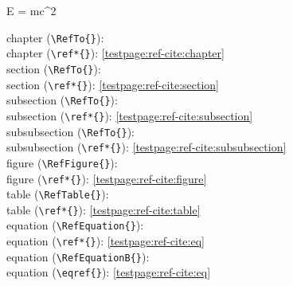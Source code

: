 E = mc^2\EquationEnd

\EndChapter


chapter (\verb|\RefTo{}|): \\
chapter (\verb|\ref*{}|): \ref*{testpage:ref-cite:chapter}\\

section (\verb|\RefTo{}|): \\
section (\verb|\ref*{}|): \ref*{testpage:ref-cite:section}\\

subsection (\verb|\RefTo{}|): \\
subsection (\verb|\ref*{}|): \ref*{testpage:ref-cite:subsection}\\

subsubsection (\verb|\RefTo{}|): \\
subsubsection (\verb|\ref*{}|): \ref*{testpage:ref-cite:subsubsection}\\

figure (\verb|\RefFigure{}|): \\
figure (\verb|\ref*{}|): \ref*{testpage:ref-cite:figure}\\

table (\verb|\RefTable{}|): \\
table (\verb|\ref*{}|): \ref*{testpage:ref-cite:table}\\

equation (\verb|\RefEquation{}|): \\
equation (\verb|\ref*{}|): \ref*{testpage:ref-cite:eq}\\

equation (\verb|\RefEquationB{}|): \\
equation (\verb|\eqref{}|): \eqref{testpage:ref-cite:eq}\\

\begin{comment}
\end{comment}
\EndChapter
